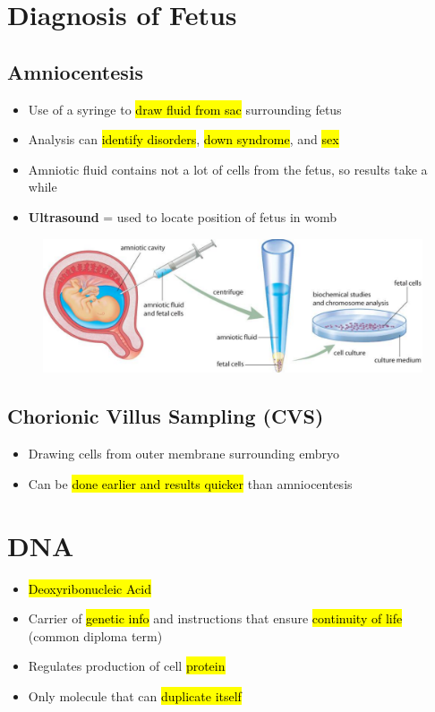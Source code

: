 \documentclass[a4paper,12pt]{article}
\begin{document}
\section{Diagnosis of Fetus}

\subsection{Amniocentesis}
\begin{itemize}
    \item{Use of a syringe to \hl{draw fluid from sac} surrounding fetus}
    \item{Analysis can \hl{identify disorders}, \hl{down syndrome}, and \hl{sex}}
    \item{Amniotic fluid contains not a lot of cells from the fetus, so results take a while}
    \item{\textbf{Ultrasound} = used to locate position of fetus in womb}
\end{itemize}

\begin{figure}[H]
    \centering
    \includegraphics[width=\textwidth]{amnio}
\end{figure}

\subsection{Chorionic Villus Sampling (CVS)}
\begin{itemize}
    \item{Drawing cells from outer membrane surrounding embryo}
    \item{Can be \hl{done earlier and results quicker} than amniocentesis}
\end{itemize}

\pagebreak

\section{DNA}
\begin{itemize}
    \item{\hl{Deoxyribonucleic Acid}}
    \item{Carrier of \hl{genetic info} and instructions that ensure \hl{continuity of life} \\ (common diploma term)}
    \item{Regulates production of cell \hl{protein}}
    \item{Only molecule that can \hl{duplicate itself}}
\end{itemize}
\end{document}
